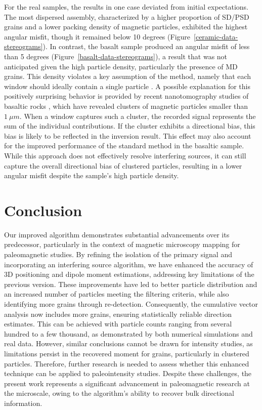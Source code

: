 For the real samples, the results in one case deviated from initial expectations. The most dispersed assembly, characterized by a higher proportion of SD/PSD grains and a lower packing density of magnetic particles, exhibited the highest angular misfit, though it remained below 10 degrees (Figure~\ref{ceramic-data-stereograms}). In contrast, the basalt sample produced an angular misfit of less than 5 degrees (Figure~\ref{basalt-data-stereograms}), a result that was not anticipated given the high particle density, particularly the presence of MD grains. This density violates a key assumption of the method, namely that each window should ideally contain a single particle \citep{Souza-Junior2024}. A possible explanation for this positively surprising behavior is provided by recent nanotomography studies of basaltic rocks \citep[\textit{e.g.}][]{Out2024, Out2025}, which have revealed clusters of magnetic particles smaller than \(1~\mu m\). When a window captures such a cluster, the recorded signal represents the sum of the individual contributions. If the cluster exhibits a directional bias, this bias is likely to be reflected in the inversion result. This effect may also account for the improved performance of the standard method in the basaltic sample. While this approach does not effectively resolve interfering sources, it can still capture the overall directional bias of clustered particles, resulting in a lower angular misfit despite the sample’s high particle density.


\section{Conclusion}

Our improved algorithm demonstrates substantial advancements over its predecessor, particularly in the context of magnetic microscopy mapping for paleomagnetic studies. By refining the isolation of the primary signal and incorporating an interfering source algorithm, we have enhanced the accuracy of 3D positioning and dipole moment estimations, addressing key limitations of the previous version. These improvements have led to better particle distribution and an increased number of particles meeting the filtering criteria, while also identifying more grains through re-detection. Consequently, the cumulative vector analysis now includes more grains, ensuring statistically reliable direction estimates. This can be achieved with particle counts ranging from several hundred to a few thousand, as demonstrated by both numerical simulations and real data. However, similar conclusions cannot be drawn for intensity studies, as limitations persist in the recovered moment for grains, particularly in clustered particles. Therefore, further research is needed to assess whether this enhanced technique can be applied to paleointensity studies. Despite these challenges, the present work represents a significant advancement in paleomagnetic research at the microscale, owing to the algorithm's ability to recover bulk directional information.

